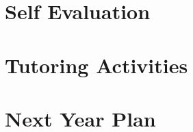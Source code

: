 \documentclass[runningheads]{llncs}
\begin{document}

\section{Self Evaluation}

\section{Tutoring Activities}

\section{Next Year Plan}


%
%
%
\nocite{*}


\end{document}

